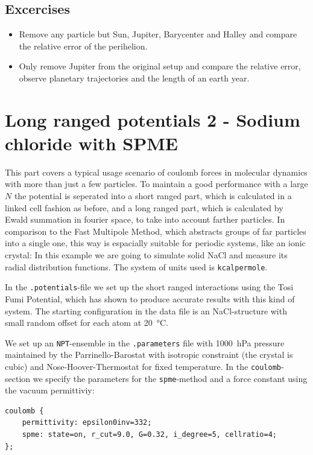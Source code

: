 \subsection{Excercises}
\begin{itemize}
    \item Remove any particle but Sun, Jupiter, Barycenter and Halley
        and compare the relative error of the perihelion.
    \item Only remove Jupiter from the original setup and compare the
        relative error, observe planetary trajectories and the length of an
        earth year.
\end{itemize}


\section{Long ranged potentials 2 - Sodium chloride with SPME}
This part covers a typical usage scenario of coulomb forces in molecular
dynamics with more than just a few particles. To maintain a good
performance with a large $N$ the potential is seperated into a short
ranged part, which is calculated in a linked cell fashion as before, and
a long ranged part, which is calculated by Ewald summation in fourier
space, to take into account farther particles. In comparison to the Fast
Multipole Method, which abstracts groups of far particles into a single
one, this way is espacially suitable for periodic systems, like an ionic
crystal: In this example we are going to simulate solid NaCl and measure
its radial distribution functions. The system
of units used is \texttt{kcalpermole}.

In the \texttt{.potentials}-file we set up the short ranged interactions
using the Tosi Fumi\cite{tosifuminacl} Potential, which has shown to
produce accurate results with this kind of system. The starting
configuration in the data file is an NaCl-structure with small random
offset for each atom at \SI{20}{\celsius}.

We set up an \texttt{NPT}-ensemble in the \texttt{.parameters} file with
\SI{1000}{\hecto\pascal} pressure maintained by the Parrinello-Barostat with
isotropic constraint (the crystal is cubic) and
Nose-Hoover-Thermostat for fixed temperature. In the
\texttt{coulomb}-section we specify the parameters for the
\texttt{spme}-method and a force constant using the vacuum permittiviy:

\begin{lstlisting}
coulomb {
    permittivity: epsilon0inv=332;
    spme: state=on, r_cut=9.0, G=0.32, i_degree=5, cellratio=4;
};
\end{lstlisting}

